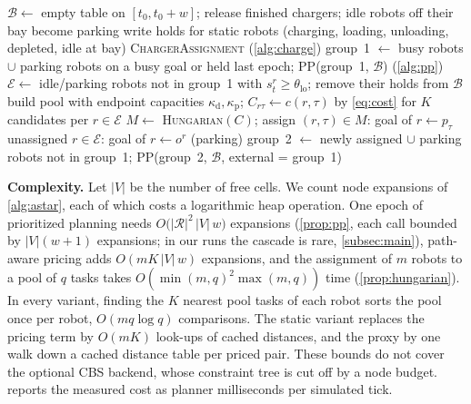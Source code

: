 \begin{algorithm}[t]
\caption{\sname\ epoch (rolling horizon)}\label{alg:pact}
$\mathcal{B}\gets$ empty table on $[t_0,t_0+w]$; release finished chargers; idle robots off their bay become parking\;
write holds for static robots (charging, loading, unloading, depleted, idle at bay)\;
\textsc{ChargerAssignment} (\cref{alg:charge})\;
group~1 $\gets$ busy robots $\cup$ parking robots on a busy goal or held last epoch; \textsc{PP}(group~1, $\mathcal{B}$) (\cref{alg:pp})\;
$\mathcal{E}\gets$ idle/parking robots not in group~1 with $s^r_t\ge\theta_{\mathrm{lo}}$; remove their holds from $\mathcal{B}$\;
build pool with endpoint capacities $\kappa_{\mathrm{d}},\kappa_{\mathrm{p}}$; $C_{r\tau}\gets c(r,\tau)$ by \cref{eq:cost} for $K$ candidates per $r\in\mathcal{E}$\;
$M\gets$ \textsc{Hungarian}$(C)$; assign $(r,\tau)\in M$: goal of $r\gets p_\tau$\;
unassigned $r\in\mathcal{E}$: goal of $r\gets o^r$ (parking)\;
group~2 $\gets$ newly assigned $\cup$ parking robots not in group~1; \textsc{PP}(group~2, $\mathcal{B}$, external = group~1)\;
\end{algorithm}

\noindent\textbf{Complexity.}
Let $|V|$ be the number of free cells. We count node expansions of
\cref{alg:astar}, each of which costs a logarithmic heap operation. One epoch
of prioritized planning needs $O\bigl(|\mathcal{R}|^2\,|V|\,w\bigr)$
expansions (\cref{prop:pp}, each
call bounded by $|V|(w+1)$ expansions; in our runs the cascade is rare,
\cref{subsec:main}), path-aware pricing adds $O(mK\,|V|\,w)$ expansions, and
the assignment of $m$ robots to a pool of $q$ tasks takes
$O(\min(m,q)^2\max(m,q))$ time (\cref{prop:hungarian}). In every variant,
finding the $K$ nearest pool tasks of each robot sorts the pool once per
robot, $O(mq\log q)$ comparisons. The static variant replaces the pricing term by $O(mK)$
look-ups of cached distances, and the proxy by one walk down a cached
distance table per priced pair. These bounds do not cover the optional CBS
backend, whose constraint tree is cut off by a node budget.
 reports the measured cost as planner milliseconds per
simulated tick.
